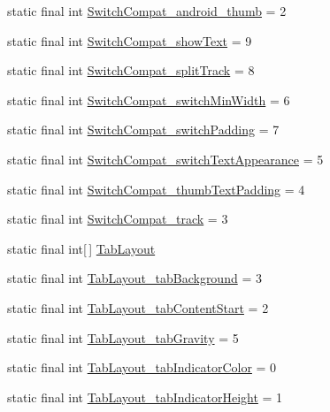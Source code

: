 \begin{DoxyCompactItemize}
\item 
static final int \hyperlink{classcheck_1_1test_1_1_r_1_1styleable_a22ffd7de92a4d9d0703e1c36ee15e59c}{Switch\+Compat\+\_\+android\+\_\+thumb} = 2
\item 
static final int \hyperlink{classcheck_1_1test_1_1_r_1_1styleable_a8156a68b3d19ff2ccc3cac1451ba5aa1}{Switch\+Compat\+\_\+show\+Text} = 9
\item 
static final int \hyperlink{classcheck_1_1test_1_1_r_1_1styleable_a2209e4bf912668ea5826e5f0fbb4196e}{Switch\+Compat\+\_\+split\+Track} = 8
\item 
static final int \hyperlink{classcheck_1_1test_1_1_r_1_1styleable_a5008f56d15445e1e76705edbb100cbd3}{Switch\+Compat\+\_\+switch\+Min\+Width} = 6
\item 
static final int \hyperlink{classcheck_1_1test_1_1_r_1_1styleable_a91263d5b37a23dd554977465783c67bd}{Switch\+Compat\+\_\+switch\+Padding} = 7
\item 
static final int \hyperlink{classcheck_1_1test_1_1_r_1_1styleable_a89ea5d1aeeef77c9a3dad277bdab7d07}{Switch\+Compat\+\_\+switch\+Text\+Appearance} = 5
\item 
static final int \hyperlink{classcheck_1_1test_1_1_r_1_1styleable_a95c824ebefc72184d7d92ae14058c7c4}{Switch\+Compat\+\_\+thumb\+Text\+Padding} = 4
\item 
static final int \hyperlink{classcheck_1_1test_1_1_r_1_1styleable_a96e29bef8e291fd5b97d301aaab3e463}{Switch\+Compat\+\_\+track} = 3
\item 
static final int\mbox{[}$\,$\mbox{]} \hyperlink{classcheck_1_1test_1_1_r_1_1styleable_a2a3232e8d38a43f5131a16385abbbed8}{Tab\+Layout}
\item 
static final int \hyperlink{classcheck_1_1test_1_1_r_1_1styleable_a841fbc3f9478cc8cb55372aafdab6dcb}{Tab\+Layout\+\_\+tab\+Background} = 3
\item 
static final int \hyperlink{classcheck_1_1test_1_1_r_1_1styleable_acfca4d1abebaf4cd27f1340340be23dc}{Tab\+Layout\+\_\+tab\+Content\+Start} = 2
\item 
static final int \hyperlink{classcheck_1_1test_1_1_r_1_1styleable_a32ac466824c24a1fb95264589256c0a3}{Tab\+Layout\+\_\+tab\+Gravity} = 5
\item 
static final int \hyperlink{classcheck_1_1test_1_1_r_1_1styleable_abe4a618bcb92a95c54007a1a200f0279}{Tab\+Layout\+\_\+tab\+Indicator\+Color} = 0
\item 
static final int \hyperlink{classcheck_1_1test_1_1_r_1_1styleable_aca78b1820fbcf57d71fd51391a7c0bf0}{Tab\+Layout\+\_\+tab\+Indicator\+Height} = 1

\end{DoxyCompactItemize}
